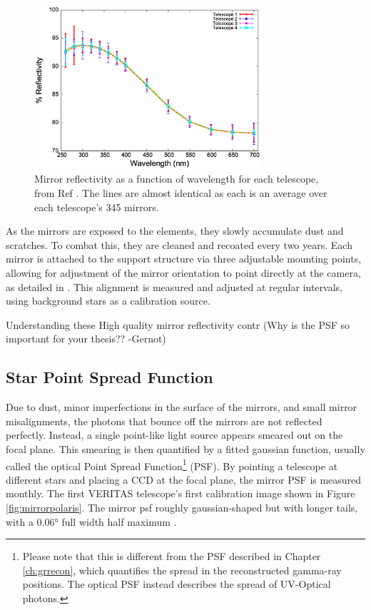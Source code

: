 \begin{figure}[ht]
  \centering
  \includegraphics[width=0.75\textwidth]{images/mirror_reflect}
  \caption[Mirror Reflectivity]{
    Mirror reflectivity as a function of wavelength for each telescope, from Ref \cite{mirrorfacets}. 
    The lines are almost identical as each is an average over each telescope's 345 mirrors.
  }
  \label{fig:mirreflect}
\end{figure}

As the mirrors are exposed to the elements, they slowly accumulate dust and scratches.
To combat this, they are cleaned and recoated every two years.
Each mirror is attached to the support structure via three adjustable mounting points, allowing for adjustment of the mirror orientation to point directly at the camera, as detailed in \cite{mirroralign}.
This alignment is measured and adjusted at regular intervals, using background stars as a calibration source.

Understanding these 
High quality mirror reflectivity contr
{\color{red}(Why is the PSF so important for your thesis?? -Gernot)}

\subsection{Star Point Spread Function}

Due to dust, minor imperfections in the surface of the mirrors, and small mirror misalignments, the photons that bounce off the mirrors are not reflected perfectly.
Instead, a single point-like light source appears smeared out on the focal plane.
This smearing is then quantified by a fitted gaussian function, usually called the optical Point Spread Function\footnote{Please note that this is different from the PSF described in Chapter \ref{ch:grrecon}, which quantifies the spread in the reconstructed gamma-ray positions.  The optical PSF instead describes the spread of UV-Optical photons.} (PSF).
By pointing a telescope at different stars and placing a CCD at the focal plane, the mirror PSF is measured monthly.
The first VERITAS telescope's first calibration image shown in Figure \ref{fig:mirrorpolaris}.
The mirror psf roughly gaussian-shaped but with longer tails, with a $ \ang{0.06} $ full width half maximum \cite{Veritas_Detector}.

